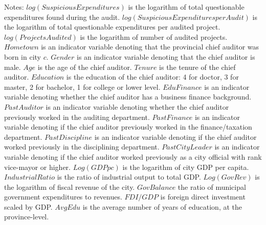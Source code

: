 \begin{table}[p]
{\begin{threeparttable}
\begin{tablenotes}\item Notes: $ log(SuspiciousExpenditures) $ is the logarithm of total questionable expenditures found during the audit.  $ log(SuspiciousExpenditures per Audit) $ is the logarithm of total questionable expenditures per audited project. $ log(Projects Audited) $ is the logarithm of number of audited projects. $ Hometown $ is an indicator variable denoting that the provincial chief auditor was born in city $ c $. $ Gender $ is an indicator variable denoting that the chief auditor is male. $ Age $ is the age of the chief auditor. $ Tenure $ is the tenure of the chief auditor. $ Education $ is the education of the chief auditor: 4 for doctor, 3 for master, 2 for bachelor, 1 for college or lower level. $ EduFinance $ is an indicator variable denoting whether the chief auditor has a business finance background. $ PastAuditor $ is an indicator variable denoting whether the chief auditor previously worked in the auditing department. $ PastFinance $ is an indicator variable denoting if the chief auditor previously worked in the finance/taxation department. $ PastDiscipline $ is an indicator variable denoting if the chief auditor worked previously in the disciplining department. $ PastCityLeader $ is an indicator variable denoting if the chief auditor worked previously as a city official with rank vice-mayor or higher. $ Log(GDP pc) $ is the logarithm of city GDP per capita. $ IndustrialRatio $ is the ratio of industrial output to total GDP. $ Log(GovRev) $ is the logarithm of fiscal revenue of the city. $ GovBalance $ the ratio of municipal government expenditures to revenues. $ FDI/GDP $ is foreign direct investment scaled by GDP. $ AvgEdu $ is the average number of years of education, at the province-level. \end{tablenotes}
\end{threeparttable}}\end{table}
